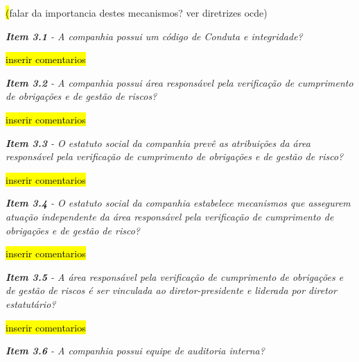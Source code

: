 \hl(falar da importancia destes mecanismos? ver diretrizes ocde)

\begin{framed}
\noindent\textit{\textbf{Item 3.1} - A companhia possui um código de Conduta e integridade?}
\end{framed}

\hl{inserir comentarios}

\begin{framed}
\noindent\textit{\textbf{Item 3.2} - A companhia possui área responsável pela verificação de cumprimento de obrigações e de gestão de riscos?}
\end{framed}

\hl{inserir comentarios}

\begin{framed}
\noindent\textit{\textbf{Item 3.3} - O estatuto social da companhia prevê as atribuições da área responsável pela verificação de cumprimento de obrigações e de gestão de risco?}
\end{framed}

\hl{inserir comentarios}

\begin{framed}
\noindent\textit{\textbf{Item 3.4} - O estatuto social da companhia estabelece mecanismos que assegurem atuação independente da área responsável pela verificação de cumprimento de obrigações e de gestão de risco?}
\end{framed}

\hl{inserir comentarios}

\begin{framed}
\noindent\textit{\textbf{Item 3.5} - A área responsável pela verificação de cumprimento de obrigações e de gestão de riscos é ser vinculada ao diretor-presidente e liderada por diretor estatutário?}
\end{framed}

\hl{inserir comentarios}

\begin{framed}
\noindent\textit{\textbf{Item 3.6} - A companhia possui equipe de auditoria interna?}
\end{framed}

